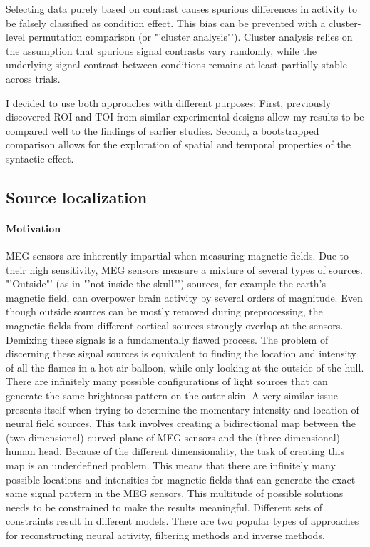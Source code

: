 Selecting data purely based on contrast causes spurious differences in activity to be falsely classified as condition effect.
This bias can be prevented with a cluster-level permutation comparison (or "'cluster analysis"').
Cluster analysis relies on the assumption that spurious signal contrasts vary randomly, while the underlying signal contrast between conditions remains at least partially stable across trials.

I decided to use both approaches with different purposes:
First, previously discovered ROI and TOI from similar experimental designs allow my results to be compared well to the findings of earlier studies.
Second, a bootstrapped comparison allows for the exploration of spatial and temporal properties of the syntactic effect.

\subsection{Source localization}

\paragraph{Motivation}
MEG sensors are inherently impartial when measuring magnetic fields.
Due to their high sensitivity, MEG sensors measure a mixture of several types of sources.
"'Outside"' (as in "'not inside the skull"') sources, for example the earth's magnetic field, can overpower brain activity by several orders of magnitude.
Even though outside sources can be mostly removed during preprocessing, the magnetic fields from different cortical sources strongly overlap at the sensors.
Demixing these signals is a fundamentally flawed process.
The problem of discerning these signal sources is equivalent to finding the location and intensity of all the flames in a hot air balloon, while only looking at the outside of the hull.
There are infinitely many possible configurations of light sources that can generate the same brightness pattern on the outer skin.
A very similar issue presents itself when trying to determine the momentary intensity and location of neural field sources.
This task involves creating a bidirectional map between the (two-dimensional) curved plane of MEG sensors and the (three-dimensional) human head.
Because of the different dimensionality, the task of creating this map is an underdefined problem.
This means that there are infinitely many possible locations and intensities for magnetic fields that can generate the exact same signal pattern in the MEG sensors.
This multitude of possible solutions needs to be constrained to make the results meaningful.
Different sets of constraints result in different models.
There are two popular types of approaches for reconstructing neural activity, filtering methods and inverse methods.

